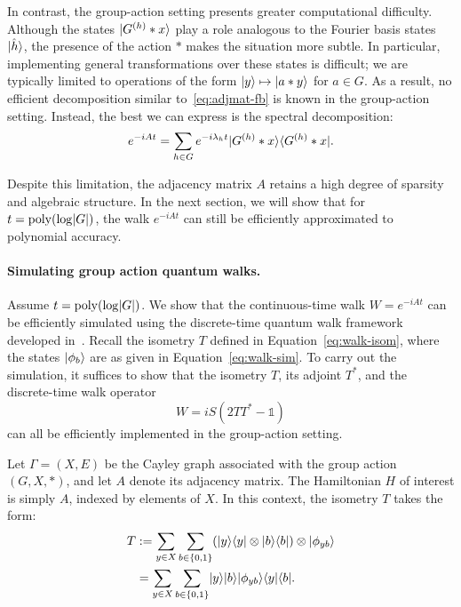 \documentclass[11pt]{article}
\theoremstyle{definition}
\begin{document}
    In contrast, the group-action setting presents greater computational difficulty. Although the states \( \lvert G^{(h)} * x\rangle \) play a role analogous to the Fourier basis states \( \lvert\hat{h}\rangle \), the presence of the action \( * \) makes the situation more subtle. In particular, implementing general transformations over these states is difficult; we are typically limited to operations of the form \( \lvert y\rangle \mapsto \lvert a * y\rangle \) for \( a \in G \). As a result, no efficient decomposition similar to~\eqref{eq:adjmat-fb} is known in the group-action setting. Instead, the best we can express is the spectral decomposition:
    \[
    e^{-iAt} = \sum_{h \in G} e^{-i\lambda_h t} \lvert G^{(h)} * x\rangle \langle G^{(h)} * x\rvert.
    \]

    Despite this limitation, the adjacency matrix \( A \) retains a high degree of sparsity and algebraic structure. In the next section, we will show that for \( t = \operatorname{poly}(\log \lvert G\rvert) \), the walk \( e^{-iAt} \) can still be efficiently approximated to polynomial accuracy.


    
\paragraph{Simulating group action quantum walks.}
Assume \( t = \operatorname{poly}(\log \lvert G\rvert) \). We show that the continuous-time walk \( W = e^{-iAt} \) can be efficiently simulated using the discrete-time quantum walk framework developed in~\cite{childs2010relationship, berry2015hamiltonian}. Recall the isometry \( T \) defined in Equation~\eqref{eq:walk-isom}, where the states \( \lvert\phi_b\rangle \) are as given in Equation~\eqref{eq:walk-sim}. To carry out the simulation, it suffices to show that the isometry \( T \), its adjoint \( T^* \), and the discrete-time walk operator
\[
W = iS(2TT^* - \mathds{1})
\]
can all be efficiently implemented in the group-action setting.

Let \( \Gamma = (X, E) \) be the Cayley graph associated with the group action \( (G, X, *) \), and let \( A \) denote its adjacency matrix. The Hamiltonian \( H \) of interest is simply \( A \), indexed by elements of \( X \). In this context, the isometry \( T \) takes the form:
\begin{align*}
T
& := \sum_{y \in X} \sum_{b \in \{0, 1\}} (\lvert y\rangle\langle y\rvert \otimes \lvert b\rangle\langle b\rvert) \otimes \lvert\phi_{yb}\rangle \\
& = \sum_{y \in X} \sum_{b \in \{0, 1\}} \lvert y\rangle \lvert b\rangle \lvert\phi_{yb}\rangle \langle y\rvert \langle b\rvert.
\end{align*}
\end{document}
